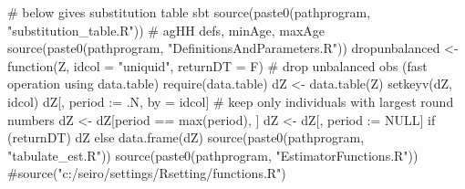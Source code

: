\tableofcontents 

\setlength{\baselineskip}{12pt}




\begin{Schunk}
\begin{Sinput}
# below gives substitution table sbt
source(paste0(pathprogram, "substitution_table.R"))
# agHH defs, minAge, maxAge
source(paste0(pathprogram, "DefinitionsAndParameters.R")) 
dropunbalanced <- function(Z, idcol = "uniquid", returnDT = F) {
#	drop unbalanced obs (fast operation using data.table)
  require(data.table)
  dZ <- data.table(Z)
  setkeyv(dZ, idcol)
  dZ[, period := .N, by = idcol]
  # keep only individuals with largest round numbers
  dZ <- dZ[period == max(period), ]
  dZ <- dZ[, period := NULL]
  if (returnDT) dZ else data.frame(dZ)
}
source(paste0(pathprogram, "tabulate_est.R"))
source(paste0(pathprogram, "EstimatorFunctions.R"))
#source("c:/seiro/settings/Rsetting/functions.R")
\end{Sinput}
\end{Schunk}


